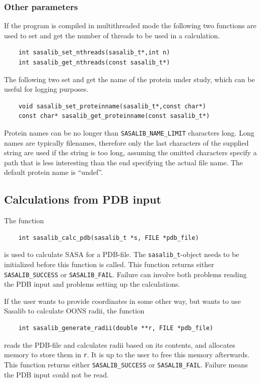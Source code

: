 \documentclass[a4paper,11pt]{article}
\begin{document}
\subsubsection{Other parameters}
If the program is compiled in multithreaded mode the following two
functions are used to set and get the number of threads to be used in
a calculation.
\begin{verbatim}
    int sasalib_set_nthreads(sasalib_t*,int n)
    int sasalib_get_nthreads(const sasalib_t*)
\end{verbatim}
The following two set and get the name of the protein under study,
which can be useful for logging purposes.
\begin{verbatim}
    void sasalib_set_proteinname(sasalib_t*,const char*)
    const char* sasalib_get_proteinname(const sasalib_t*)
\end{verbatim}
Protein names can be no longer than \verb|SASALIB_NAME_LIMIT|
characters long. Long names are typically filenames, therefore only
the last characters of the supplied string are used if the string is
too long, assuming the omitted characters specify a path that is less
interesting than the end specifying the actual file name. The default
protein name is ``undef''.

\subsection{Calculations from PDB input}

The function 
\begin{verbatim}
    int sasalib_calc_pdb(sasalib_t *s, FILE *pdb_file)
\end{verbatim}
is used to calculate SASA for a PDB-file. The
\verb|sasalib_t|-object needs to be initialized before this
function is called. This function returns either
\verb|SASALIB_SUCCESS| or \verb|SASALIB_FAIL|. Failure can
involve both problems reading the PDB input and problems setting up
the calculations.

If the user wants to provide coordinates in some other way, but wants to
use Sasalib to calculate OONS radii, the function
\begin{verbatim}
    int sasalib_generate_radii(double **r, FILE *pdb_file)
\end{verbatim}
reads the PDB-file and calculates radii based on its contents, and
allocates memory to store them in \texttt{r}. It is up to the user to
free this memory afterwards. This function returns either
\verb|SASALIB_SUCCESS| or \verb|SASALIB_FAIL|. Failure means the
PDB input could not be read.
\end{document}
